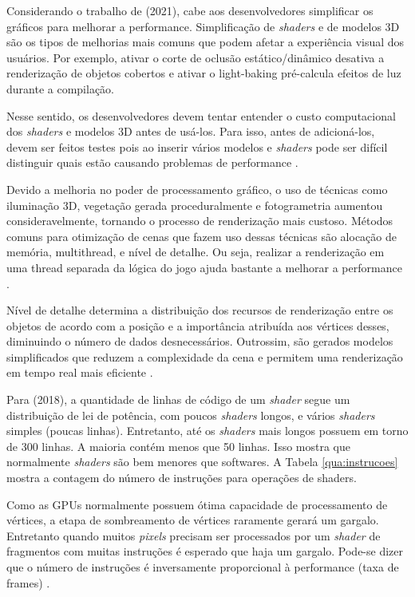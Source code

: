 Considerando o trabalho de  (2021), cabe aos desenvolvedores simplificar os gráficos para melhorar a performance. Simplificação de \textit{shaders} e de modelos 3D são os tipos de melhorias mais comuns que podem afetar a experiência visual dos usuários. Por exemplo, ativar o corte de oclusão estático/dinâmico desativa a renderização de objetos cobertos e ativar o \Gls{light-baking} pré-calcula efeitos de luz durante a compilação.

Nesse sentido, os desenvolvedores devem tentar entender o custo computacional dos \textit{shaders} e modelos 3D antes de usá-los. Para isso, antes de adicioná-los, devem ser feitos testes pois ao inserir vários modelos e \textit{shaders} pode ser difícil distinguir quais estão causando problemas de performance \cite{nusrat2021commit}.

Devido a melhoria no poder de processamento gráfico, o uso de técnicas como iluminação 3D, vegetação gerada proceduralmente e fotogrametria aumentou consideravelmente, tornando o processo de renderização mais custoso. Métodos comuns para otimização de cenas que fazem uso dessas técnicas são alocação de memória, \Gls{multithread}, e nível de detalhe. Ou seja, realizar a renderização em uma thread separada da lógica do jogo ajuda bastante a melhorar a performance \cite{zhang2017vegetation}.

Nível de detalhe determina a distribuição dos recursos de renderização entre os objetos de acordo com a posição e a importância atribuída aos vértices desses, diminuindo o número de dados desnecessários. Outrossim, são gerados modelos simplificados que reduzem a complexidade da cena e permitem uma renderização em tempo real mais eficiente \cite{zhang2017vegetation}.

Para  (2018), a quantidade de linhas de código de um \textit{shader} segue um distribuição de lei de potência, com poucos \textit{shaders} longos, e vários \textit{shaders} simples (poucas linhas). Entretanto, até os \textit{shaders} mais longos possuem em torno de 300 linhas. A maioria contém menos que 50 linhas. Isso mostra que normalmente \textit{shaders} são bem menores que softwares. A Tabela \ref{qua:instrucoes} mostra a contagem do número de instruções para operações de shaders.



Como as GPUs normalmente possuem ótima capacidade de processamento de vértices, a etapa de sombreamento de vértices raramente gerará um gargalo. Entretanto quando muitos \textit{pixels} precisam ser processados por um \textit{shader} de fragmentos com muitas instruções é esperado que haja um gargalo. Pode-se dizer que o número de instruções é inversamente proporcional à performance (taxa de frames) \cite{optimizationMobile}.

